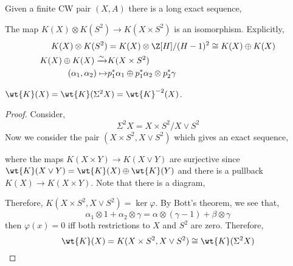 \documentclass[12pt]{extarticle}
\begin{document}
\begin{prop}
Given a finite CW pair $(X, A)$ there is a long exact sequence,
\begin{center}
\end{center}
\end{prop}

\begin{thm}[Bott]
The map $K(X) \otimes K(S^2) \to K(X \times S^2)$ is an isomorphism. Explicitly,
\begin{align*}
K(X) \otimes K(S^2) & = K(X) \otimes \Z[H]/(H-1)^2 \cong K(X) \oplus K(X)
\\
K(X) \oplus K(X) \xrightarrow{\sim} & K(X \times S^2)
\\
(\alpha_1, \alpha_2) \mapsto & p_1^* \alpha_1 \oplus p_1^* \alpha_2 \otimes p_2^* \gamma  
\end{align*}
\end{thm}

\begin{cor}
$\wt{K}(X) = \wt{K}(\Sigma^2 X) = \wt{K}^{-2}(X)$. 
\end{cor}

\begin{proof}
Consider,
\[ \Sigma^2 X = X \times S^2 / X \vee S^2 \]
Now we consider the pair $(X \times S^2, X \vee S^2)$ which gives an exact sequence,
\begin{center}
\end{center}
where the maps $K(X \times Y) \to K(X \vee Y)$ are surjective since $\wt{K}(X \vee Y) = \wt{K}(X) \oplus \wt{K}(Y)$ and there is a pullback $K(X) \to K(X \times Y)$.
Note that there is a diagram,
\begin{center}
\end{center}
Therefore,  $K(X \times S^2, X \vee S^2) = \ker{\varphi}$. By Bott's theorem, we see that,
\[ \alpha_1 \otimes 1 + \alpha_2 \otimes \gamma = \alpha \otimes (\gamma - 1) + \beta \otimes \gamma \]
then $\varphi(x) = 0$ iff both restrictions to $X$ and $S^2$ are zero. 
Therefore, 
\[ \wt{K}(X) = K(X \times S^2, X \vee S^2) \cong \wt{K}(\Sigma^2 X) \]
\end{proof}
\end{document}

